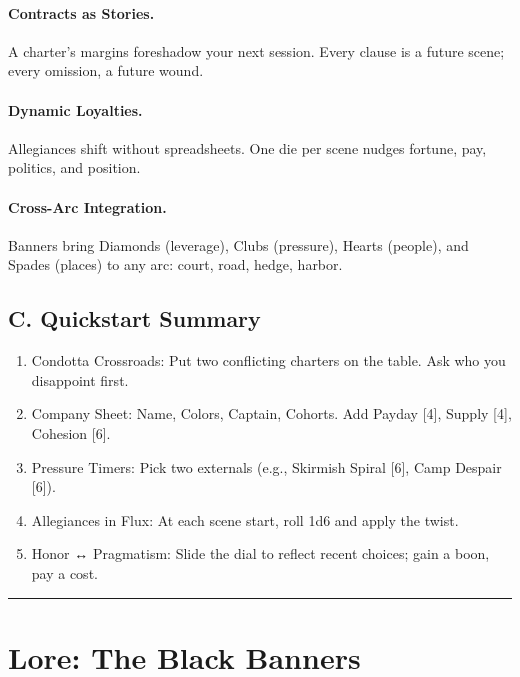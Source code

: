\documentclass[11pt]{article}
\begin{document}
\paragraph{Contracts as Stories.} A charter's margins foreshadow your next session. Every clause is a future scene; every omission, a future wound.

\paragraph{Dynamic Loyalties.} Allegiances shift without spreadsheets. One die per scene nudges fortune, pay, politics, and position.

\paragraph{Cross-Arc Integration.} Banners bring Diamonds (leverage), Clubs (pressure), Hearts (people), and Spades (places) to any arc: court, road, hedge, harbor.

\subsection*{C. Quickstart Summary}

\begin{description}[leftmargin=*,labelwidth=2cm]
\item[Two-Minute Setup]
\begin{enumerate}
    \item Condotta Crossroads: Put two conflicting charters on the table. Ask who you disappoint first.
    \item Company Sheet: Name, Colors, Captain, Cohorts. Add Payday [4], Supply [4], Cohesion [6].
    \item Pressure Timers: Pick two externals (e.g., Skirmish Spiral [6], Camp Despair [6]).
    \item Allegiances in Flux: At each scene start, roll 1d6 and apply the twist.
    \item Honor ↔ Pragmatism: Slide the dial to reflect recent choices; gain a boon, pay a cost.
\end{enumerate}
\end{description}

\rule{\textwidth}{0.4pt}

\section*{Lore: The Black Banners}
\end{document}
